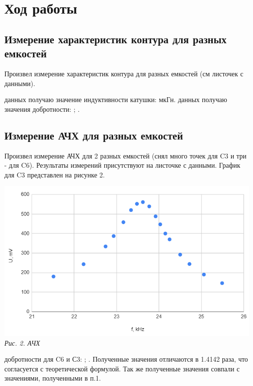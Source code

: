 

\section{Ход работы}

\subsection{Измерение характеристик контура для разных емкостей}

Произвел измерение характеристик контура для разных емкостей (см листочек с данными).

 данных получаю значение индуктивности катушки:  мкГн.
 данных получаю значения добротности: ; .

\subsection{Измерение АЧХ для разных емкостей}

Произвел измерение АЧХ для 2 разных емкостей (снял много точек для C3 и три - для C6). Результаты измерений присутствуют на листочке с данными. График для C3 представлен на рисунке 2.

\begin{center}

    \includegraphics[scale=0.9]{picks/323-graph1.png} \\
    \textit{Рис. 2. АЧХ}

\end{center}

 добротности для C6 и С3: ; . Полученные значения отличаются в \mth{\approx} 1.4142 раза, что согласуется с теоретической формулой. Так же полученные значения совпали с значениями, полученными в п.1.

